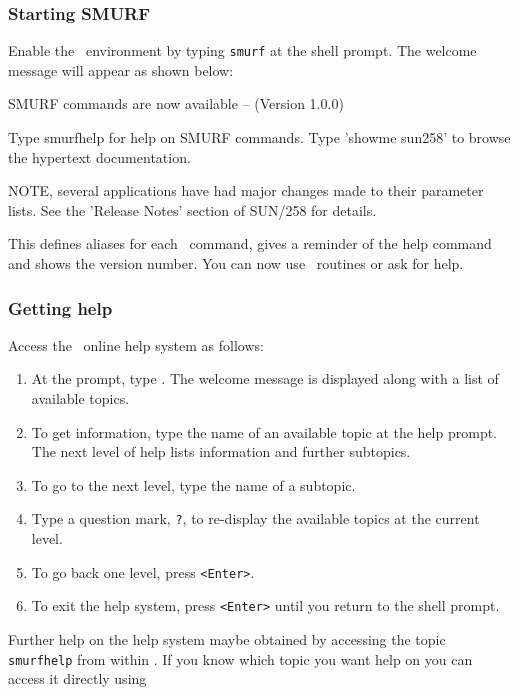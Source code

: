 \documentclass[oneside,11pt]{starlink}
\begin{document}
\subsubsection{Starting SMURF}

Enable the \SMURF\ environment by typing \verb+smurf+ at the shell
prompt. The welcome message will appear as shown below:
\begin{terminalv}

        SMURF commands are now available -- (Version 1.0.0)

        Type smurfhelp for help on SMURF commands.
        Type 'showme sun258' to browse the hypertext documentation.

        NOTE, several applications have had major changes made to their
        parameter lists. See the 'Release Notes' section of SUN/258 for
        details.

\end{terminalv}
This defines aliases for each \SMURF\ command, gives a reminder of the
help command and shows the version number. You can now use \SMURF\
routines or ask for help.

\subsubsection{Getting help}

Access the \SMURF\ online help system as follows:
\begin{enumerate}
\item At the prompt, type \smurfhelp. The welcome message is
  displayed along with a list of available topics.
\item To get information, type the name of an available topic at the
  help prompt.  The next level of help lists information and further
  subtopics.
\item To go to the next level, type the name of a subtopic.
\item Type a question mark, \verb+?+, to re-display the available
  topics at the current level.
\item To go back one level, press \verb+<Enter>+.
\item To exit the help system, press \verb+<Enter>+ until you return
  to the shell prompt.
\end{enumerate}
Further help on the help system maybe obtained by accessing the topic
\verb+smurfhelp+ from within \smurfhelp. If you know which topic you
want help on you can access it directly using
\end{document}
